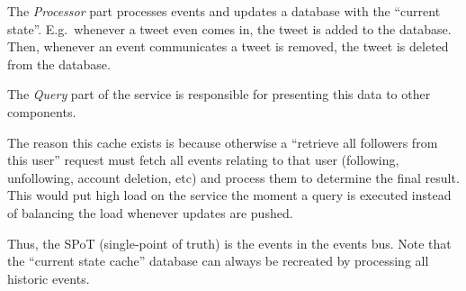 The \textit{Processor} part processes events and updates a database with the ``current state''. E.g.\ whenever a tweet even comes in, the tweet is added to the database. Then, whenever an event communicates a tweet is removed, the tweet is deleted from the database. 

The \textit{Query} part of the service is responsible for presenting this data to other components.

\FloatBarrier%
The reason this cache exists is because otherwise a ``retrieve all followers from this user'' request must fetch all events relating to that user (following, unfollowing, account deletion, etc) and process them to determine the final result. This would put high load on the service the moment a query is executed instead of balancing the load whenever updates are pushed.

Thus, the SPoT (single-point of truth) is the events in the events bus. Note that the ``current state cache'' database can always be recreated by processing all historic events.